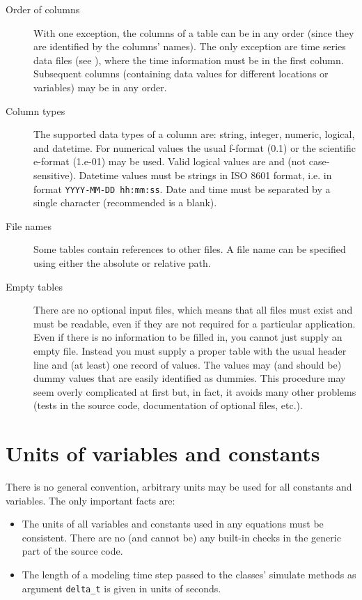 \begin{description}
  \item [Order of columns] With one exception, the columns of a table can be in any order (since they are identified by the columns' names). The only exception are time series data files (see ), where the time information must be in the first column. Subsequent columns (containing data values for different locations or variables) may be in any order.
  \item [Column types] The supported data types of a column are: string, integer, numeric, logical, and datetime. For numerical values the usual f-format (0.1) or the scientific e-format (1.e-01) may be used. Valid logical values are \true{} and \false{} (not case-sensitive). Datetime values must be strings in ISO 8601 format, i.e.{} in format \texttt{YYYY-MM-DD hh:mm:ss}. Date and time must be separated by a single character (recommended is a blank).
  \item [File names] Some tables contain references to other files. A file name can be specified using either the absolute or relative path.
  \item [Empty tables] There are no optional input files, which means that all files must exist and must be readable, even if they are not required for a particular application. Even if there is no information to be filled in, you cannot just supply an empty file. Instead you must supply a proper table with the usual header line and (at least) one record of values. The values may (and should be) dummy values that are easily identified as dummies. This procedure may seem overly complicated at first but, in fact, it avoids many other problems (tests in the source code, documentation of optional files, etc.).
\end{description}

\section{Units of variables and constants} \label{sec:input-units}

There is no general convention, \ie{} arbitrary units may be used for all constants and variables. The only important facts are:
\begin{itemize}
  \item The units of all variables and constants used in any equations must be consistent. There are no (and cannot be) any built-in checks in the generic part of the source code.
  \item The length of a modeling time step passed to the classes' simulate methods as argument \verb!delta_t! is given in units of seconds.
\end{itemize}


